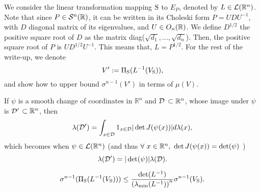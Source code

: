 We consider the linear transformation mapping $\text{S}$ to $E_P$, denoted by $L \in \mathcal{L}(\mathbb{R}^n)$. Note that since $P \in \mathcal{S}^n(\mathbb{R})$, it can be written in its Choleski form $P = U D U^{-1}$, with $D$ diagonal matrix of its eigenvalues, and $U \in O_n(\mathbb{R})$. We define $D^{1/2}$ the positive square root of $D$ as the matrix diag($\sqrt{d_1},\dots, \sqrt{d_n}$). Then, the positive square root of $P$ is $U D^{1/2} U^{-1}$. This means that, $L = P^{1/2}$. For the rest of the write-up, we denote $$V':=\Pi_{\text{S}}(L^{-1}(V_{\text{S}})),$$ and show how to upper bound $\sigma^{n-1}(V')$ in terms of $\mu(V)$.

\begin{remark} \label{rem:mappingMeasures}
If $\psi$ is a smooth change of coordinates in $\mathbb{R}^n$ and $\cal{D}$ $\subset \mathbb{R}^n$, whose image under $\psi$ is $\cal{D}'$ $\subset \mathbb{R}^n$, then
\begin{equation}
\lambda(\mathcal{D}') = \int_{x \in \mathcal{D}} 1_{x \in \mathcal{D}} |\det J(\psi(x))| d\lambda(x),
\end{equation}
which becomes when $\psi \in \mathcal{L}(\mathbb{R}^n)$ (and thus $\forall\ x \in \mathbb{R}^n, \ \det J(\psi(x)) = \det(\psi)$ )
\begin{equation}
\lambda(\mathcal{D}') = |\det(\psi)| \lambda(\mathcal{D}).
\end{equation}
\end{remark}

\begin{theorem} \label{lemma:lip}
\begin{equation}
\sigma^{n-1}(\Pi_{\text{S}}(L^{-1}(V_{\text{S}}))) \leq \frac{\det(L^{-1})}{\left(\lambda_{\min}(L^{-1})\right)^n} \sigma^{n-1}(V_{\text{S}}).
\end{equation}   
\end{theorem}

